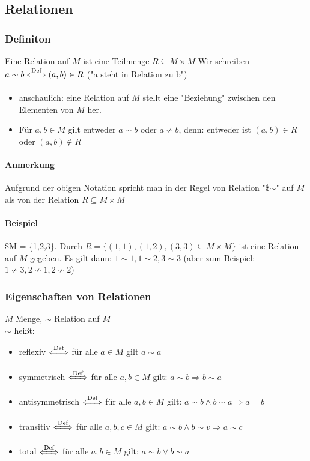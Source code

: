 \documentclass[a4paper]{scrartcl}
\theoremstyle{definition}
\theoremstyle{plain}
\theoremstyle{plain}
\theoremstyle{remark}
\theoremstyle{remark}
\theoremstyle{remark}
\begin{document}
\subsection{Relationen}
\label{sec-2-5}
\subsubsection{Definiton}
\label{sec-2-5-1}
Eine Relation auf $M$ ist eine Teilmenge $R\subseteq M\times M$
Wir schreiben $a\sim b \xLeftrightarrow{\text{Def}} (a,b) \in R$ ("a steht in Relation zu b")

\begin{itemize}
\item anschaulich: eine Relation auf $M$ stellt eine "Beziehung" zwischen den Elementen von $M$ her.
\item Für $a,b \in M$ gilt entweder $a\sim b$ oder $a\not\sim b$, denn: entweder ist $(a,b) \in R$ oder $(a,b)\not\in R$
\end{itemize}
\paragraph{Anmerkung}
\label{sec-2-5-1-1}
Aufgrund der obigen Notation spricht man in der Regel von Relation "\$$\sim$" auf $M$ als von der Relation $R \subseteq M\times M$
\paragraph{Beispiel}
\label{sec-2-5-1-2}
\$M = \{1,2,3\}. Durch $R = \{(1,1), (1,2), (3,3) \subseteq M\times M\}$ ist eine Relation auf $M$ gegeben. Es gilt dann: $1\sim 1, 1\sim 2, 3\sim 3$ (aber zum Beispiel: $1\not\sim 3, 2\not\sim 1, 2\not\sim 2$)

\subsubsection{Eigenschaften von Relationen}
\label{sec-2-5-2}
$M$ Menge, $\sim$ Relation auf $M$ \\
    $\sim$ heißt:
\begin{itemize}
\item reflexiv $\xLeftrightarrow{\text{Def}}$ für alle $a\in M$ gilt $a\sim a$
\item symmetrisch $\xLeftrightarrow{\text{Def}}$ für alle $a,b\in M$ gilt: $a\sim b \Rightarrow b\sim a$
\item antisymmetrisch $\xLeftrightarrow{\text{Def}}$ für alle $a,b \in M$ gilt: $a\sim b \wedge b\sim a \Rightarrow a = b$
\item transitiv $\xLeftrightarrow{\text{Def}}$ für alle $a,b,c\in M$ gilt: $a\sim b \wedge b\sim v \Rightarrow a\sim c$
\item total $\xLeftrightarrow{\text{Def}}$ für alle $a,b\in M$ gilt: $a\sim b \vee b\sim a$
\end{itemize}
\end{document}
